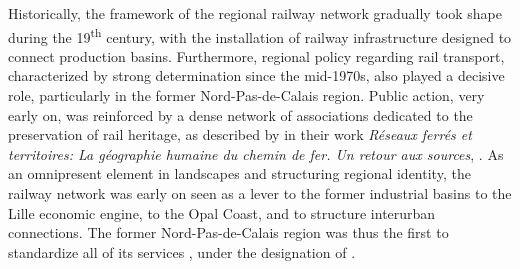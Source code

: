 \begin{refsegment}
Historically, the framework of the regional railway network gradually took shape during the 19\textsuperscript{th} century, with the installation of railway infrastructure designed to connect production basins. Furthermore, regional policy regarding rail transport, characterized by strong determination since the mid-1970s, also played a decisive role, particularly in the former Nord-Pas-de-Calais region. Public action, very early on, was reinforced by a dense network of associations dedicated to the preservation of rail heritage, as described by \textcolor{blue}{\textcite[146]{baron_reseaux_2017}} in their work \textsl{Réseaux ferrés et territoires: La géographie humaine du chemin de fer. Un retour aux sources}, . As an omnipresent element in landscapes and structuring regional identity, the railway network was early on seen as a lever to  the former industrial basins to the Lille economic engine, to  the Opal Coast, and to structure interurban connections. The former Nord-Pas-de-Calais region was thus the first to standardize all of its services \textcolor{blue}{\autocite[4]{deimon_projets_2024}}, under the designation of  \textcolor{blue}{\autocite[152]{baron_reseaux_2017}}.%
    

\end{refsegment}

